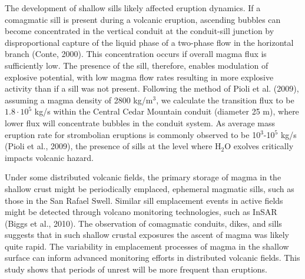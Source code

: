 \documentclass[12pt,letter]{article}
\begin{document}
The development of shallow sills likely affected eruption dynamics. If a comagmatic sill is present during a volcanic eruption, ascending bubbles can become concentrated in the vertical conduit at the conduit-sill junction by disproportional capture of the liquid phase of a two-phase flow in the horizontal branch (Conte, 2000). This concentration occurs if overall magma flux is sufficiently low. The presence of the sill, therefore, enables modulation of explosive potential, with low magma flow rates resulting in more explosive activity than if a sill was not present. Following the method of Pioli et al. (2009), assuming a magma density of 2800 kg/m$^3$, we calculate the transition flux to be $1.8\cdot 10^5$ kg/s within the Central Cedar Mountain conduit (diameter 25 m), where lower flux will concentrate bubbles in the conduit system. As average mass eruption rate for strombolian eruptions is commonly observed to be 10$^3$-10$^5$ kg/s (Pioli et al., 2009), the presence of sills at the level where H$_2$O exolves critically impacts volcanic hazard.

Under some distributed volcanic fields, the primary storage of magma in the shallow crust might be periodically emplaced, ephemeral magmatic sills, such as those in the San Rafael Swell. Similar sill emplacement events in active fields might be detected through volcano monitoring technologies, such as InSAR (Biggs et al., 2010). The observation of comagmatic conduits, dikes, and sills suggests that in such shallow crustal exposures the ascent of magma was likely quite rapid. The variability in emplacement processes of magma in the shallow surface can inform advanced monitoring efforts in distributed volcanic fields. This study shows that periods of unrest will be more frequent than eruptions.



\end{document}
